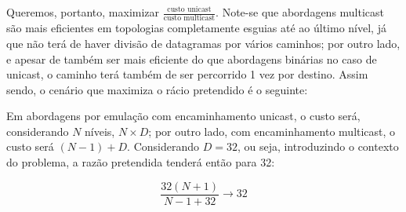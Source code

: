 \begin{enumerate}[leftmargin=\labelsep]
        Queremos, portanto, maximizar $\frac{\text{custo unicast}}{\text{custo multicast}}$.
        Note-se que abordagens multicast são mais eficientes em topologias
        completamente esguias até ao último nível, já que não terá de haver divisão
        de datagramas por vários caminhos; por outro lado, e apesar de
        também ser mais eficiente do que abordagens binárias no caso de unicast,
        o caminho terá também de ser percorrido 1 vez por destino. Assim sendo, o
        cenário que maximiza o rácio pretendido é o seguinte:

        \begin{figure}[h]
          \centering
          
        \end{figure}

        Em abordagens por emulação com encaminhamento unicast, o custo será, considerando
        $N$ níveis, $N \times D$; por outro lado, com encaminhamento multicast,
        o custo será $(N - 1) + D$. Considerando $D = 32$, ou seja, introduzindo
        o contexto do problema, a razão pretendida tenderá então para 32:

        $$
          \frac{32(N + 1)}{N - 1 + 32} \to 32
        $$

\end{enumerate}